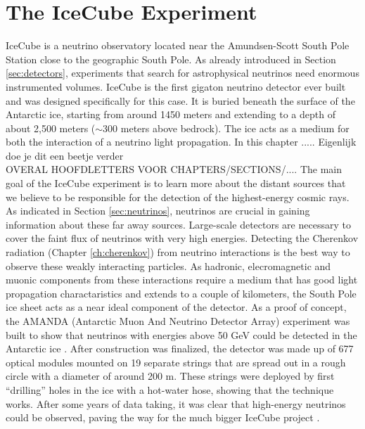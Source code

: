 \chapter{The IceCube Experiment}
IceCube is a neutrino observatory located near the Amundsen-Scott South Pole Station close to the geographic South Pole. As already introduced in Section \ref{sec:detectors}, experiments that search for astrophysical neutrinos need enormous instrumented volumes. IceCube is the first gigaton neutrino detector ever built and was designed specifically for this case. It is buried beneath the surface of the Antarctic ice, starting from around 1450 meters and extending to a depth of about 2,500 meters ($\sim$300 meters above bedrock). The ice acts as a medium for both the interaction of a neutrino light propagation. In this chapter ..... Eigenlijk doe je dit een beetje verder\\ OVERAL HOOFDLETTERS VOOR CHAPTERS/SECTIONS/....
\newline
\noindent The main goal of the IceCube experiment is to learn more about the distant sources that we believe to be responsible for the detection of the highest-energy cosmic rays. As indicated in Section \ref{sec:neutrinos}, neutrinos are crucial in gaining information about these far away sources. Large-scale detectors are necessary to cover the faint flux of neutrinos with very high energies. Detecting the Cherenkov radiation (Chapter \ref{ch:cherenkov}) from neutrino interactions is the best way to observe these weakly interacting particles. As hadronic, elecromagnetic and muonic components from these interactions require a medium that has good light propagation charactaristics and extends to a couple of kilometers, the South Pole ice sheet acts as a near ideal component of the detector. As a proof of concept, the AMANDA (Antarctic Muon And Neutrino Detector Array) experiment was built to show that neutrinos with energies above 50 GeV could be detected in the Antarctic ice \cite{amandaurl,Andres:1999hm}. After construction was finalized, the detector was made up of 677 optical modules mounted on 19 separate strings that are spread out in a rough circle with a diameter of around 200 m. These strings were deployed by first ``drilling'' holes in the ice with a hot-water hose, showing that the technique works. After some years of data taking, it was clear that high-energy neutrinos could be observed, paving the way for the much bigger IceCube project \cite{Ahrens:2002gq}.


